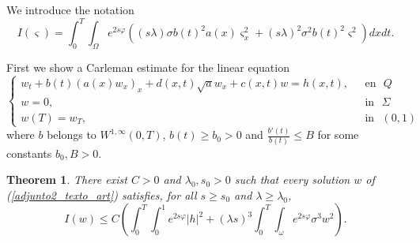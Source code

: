 \documentclass[11pt,oneside,a4papper]{osajnl}
\newtheorem{teo}{Theorem}
\begin{document}


We introduce the notation
$$
I(\varsigma) = \int_0^T\int_\Omega e^{2s\varphi}((s\lambda)\sigma b(t)^2 a(x) \varsigma_x^2 + (s\lambda)^2 \sigma^2 b(t)^2\varsigma^2)dxdt.
$$




First we show a Carleman estimate for the linear equation
   \begin{equation}\label{adjunto2_texto_art}
	\begin{cases}
		w_t+b(t)\left(a(x)w_x\right)_x+d(x,t)\sqrt{a}w_x + c(x,t)w  = h(x,t), & \ \ \ \text{en} \ \ \ {Q}\\
		w=0, & \ \ \ \text{in} \ \ \ {\Sigma}\\
        w(T) = w_T,& \ \ \ \text{in} \ \ \ (0,1)
	\end{cases}
\end{equation}
where $b$ belongs to $W^{1,\infty}(0,T)$, $b(t) \geq b_0 >0$ and $\frac{b'(t)}{b(t)} \leq B$ for some constants $b_0, B>0$. 

\begin{teo}
\label{prop_carleman_1}
	There exist $C>0$ and $\lambda_0,  s_0>0$ such that every solution $w$ of (\ref{adjunto2_texto_art}) satisfies, for all
	$s\geq s_0$ and $\lambda\geq \lambda_0$,
	\begin{equation}\label{ecjv34}
        I(w) \leq C\left(	\int_{0}^{T}\int_{0}^{1} e^{2s\varphi} |h|^2+(\lambda s)^3\int_{0}^{T}\int_{\omega}e^{2s\varphi} \sigma^3  w^2  \right).
	\end{equation}
\end{teo}
\end{document}
